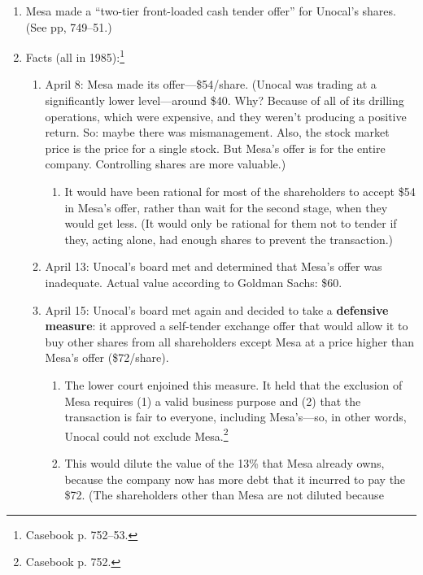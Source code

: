 \begin{enumerate}
    \item Mesa made a ``two-tier front-loaded cash tender offer'' for Unocal's 
    shares. (See pp, 749--51.)
    \item Facts (all in 1985):\footnote{Casebook p. 752--53.}
    \begin{enumerate}
        \item April 8: Mesa made its offer---\$54/share. (Unocal was trading at 
        a significantly lower level---around \$40. Why? Because of all of its 
        drilling operations, which were expensive, and they weren't producing a 
        positive return. So: maybe there was mismanagement. Also, the stock 
        market price is the price for a single stock. But Mesa's offer is for 
        the entire company. Controlling shares are more valuable.)
        \begin{enumerate}
            \item It would have been rational for most of the shareholders to 
            accept \$54 in Mesa's offer, rather than wait for the second stage, 
            when they would get less. (It would only be rational for them not to 
            tender if they, acting alone, had enough shares to prevent the 
            transaction.)
        \end{enumerate}
        \item April 13: Unocal's board met and determined that Mesa's offer was 
        inadequate. Actual value according to Goldman Sachs: \$60.
        \item April 15: Unocal's board met again and decided to take a 
        \textbf{defensive measure}: it approved a self-tender exchange offer 
        that would allow it to buy other shares from all shareholders except 
        Mesa at a price higher than Mesa's offer (\$72/share).
        \begin{enumerate}
            \item The lower court enjoined this measure. It held that the 
            exclusion of Mesa requires (1) a valid business purpose and (2) that 
            the transaction is fair to everyone, including Mesa's---so, in other 
            words, Unocal could not exclude Mesa.\footnote{Casebook p. 752.}
            \item This would dilute the value of the 13\% that Mesa already 
            owns, because the company now has more debt that it incurred to pay 
            the \$72. (The shareholders other than Mesa are not diluted because 

\end{enumerate}
\end{enumerate}
\end{enumerate}
